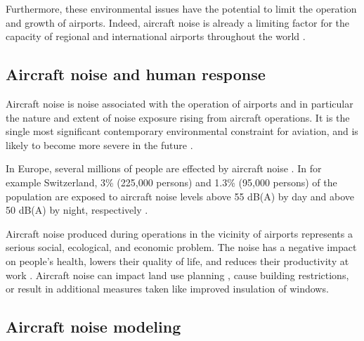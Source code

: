 Furthermore, these environmental issues have the potential to limit the
operation and growth of airports. Indeed, aircraft noise is already a limiting
factor for the capacity of regional and international airports throughout the
world \cite{Zaporozhets2011}.


\subsection{Aircraft noise and human response}
Aircraft noise is noise associated with the operation of airports and in
particular the nature and extent of noise exposure rising from aircraft
operations. It is the single most significant contemporary environmental
constraint for aviation, and is likely to become more severe in the future
\cite{Zaporozhets2011}. 

In Europe, several millions of people are effected by aircraft noise
\cite{MPDGroupLimited2007}. In for example Switzerland, 3\% (225,000 persons)
and 1.3\% (95,000 persons) of the population are exposed to aircraft noise
levels above 55 dB(A) by day and above 50 dB(A) by night, respectively
\cite{Kirk2009,Schaffer2014}. 

Aircraft noise produced during operations in the vicinity of airports represents
a serious social, ecological, and economic problem. The noise has a negative
impact on people's health, lowers their quality of life, and reduces their
productivity at work \cite{Zaporozhets2011}. Aircraft noise can impact land use
planning \cite{Freestone2010}, cause building restrictions, or result
in additional measures taken like improved insulation of windows.






\subsection{Aircraft noise modeling}




